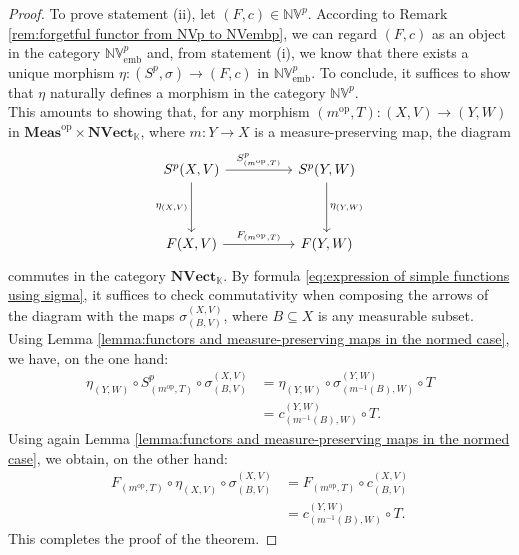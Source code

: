 \documentclass{amsart}
\theoremstyle{definition}
\theoremstyle{plain}
\newcommand{\opMeas}{\mathbf{Meas}^\mathrm{op}}
\newcommand{\NVect}{\mathbf{NVect}_{\mathbb{K}}}
\newcommand{\NVembp}{\mathbb{NV}_{\mathrm{emb}}^p}
\newcommand{\NVp}{\mathbb{NV}^p}
\begin{document}
\begin{proof}
            To prove statement (ii), let $(F,c) \in \NVp$. 
            According to Remark \ref{rem:forgetful functor from NVp to NVembp}, we can regard $(F,c)$ as an object in the category $\NVembp$ and, from statement (i), we know that there exists a unique morphism $\eta \colon (S^p,\sigma) \rightarrow (F,c)$ in $\NVembp$. 
            To conclude, it suffices to show that $\eta$ naturally defines a morphism in the category $\NVp$. \\ 
            This amounts to showing that, for any morphism $\left( m^{\mathrm{op}},T \right) \colon (X,V) \rightarrow (Y,W) $ in $\opMeas \times \NVect$, where $m \colon Y \rightarrow X$ is a measure-preserving map, the diagram
            \begin{equation*}
                \begin{tikzcd}
                    S^p(X,V) \ar[rr, "S^p_{\left( m^{\mathrm{op}},T \right)}"] \ar[dd, "\eta_{(X,V)}"']  &   & S^p(Y,W) \ar[dd, "\eta_{(Y,W)}"] \\
                        &   & \\
                    F(X,V) \ar[rr, "F_{\left( m^{\mathrm{op}},T \right)}"]    &   & F(Y,W)
                \end{tikzcd}
            \end{equation*}
            commutes in the category $\NVect$.
            By formula \eqref{eq:expression of simple functions using sigma}, it suffices to check commutativity when composing the arrows of the diagram with the maps $\sigma_{(B,V)}^{(X,V)}$, where $B \subseteq X$ is any measurable subset. 
            Using Lemma \ref{lemma:functors and measure-preserving maps in the normed case}, we have, on the one hand:
            \begin{align*}
                \eta_{(Y,W)} \circ S^p_{\left( m^{\mathrm{op}},T \right) }\circ \sigma_{(B,V)}^{(X,V)} &= \eta_{(Y,W)} \circ \sigma_{\left( m^{-1}(B),W \right)}^{(Y,W)} \circ T \\
                &= c_{\left( m^{-1}(B),W \right)}^{(Y,W)} \circ T.
            \end{align*}
            Using again Lemma \ref{lemma:functors and measure-preserving maps in the normed case}, we obtain, on the other hand:
            \begin{align*}
                F_{\left( m^{\mathrm{op}},T \right)} \circ \eta_{(X,V)}\circ \sigma_{(B,V)}^{(X,V)} &= F_{\left( m^{\mathrm{op}},T \right)} \circ c_{(B,V)}^{(X,V)} \\
                &= c_{\left( m^{-1}(B),W \right)}^{(Y,W)} \circ T.
            \end{align*}
            This completes the proof of the theorem. 
        \end{proof}
\end{document}
